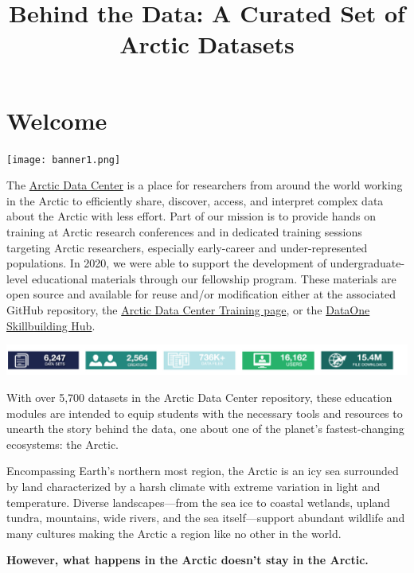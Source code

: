 \documentclass[]{book}
\title{Behind the Data: A Curated Set of Arctic Datasets}
\author{}
\date{\vspace{-2.5em}}
\begin{document}
\maketitle

{
\setcounter{tocdepth}{1}
\tableofcontents
}
\hypertarget{index}{%
\chapter*{\texorpdfstring{\textbf{Welcome}}{Welcome}}\label{index}}

\texttt{[image: banner1.png]}

The \href{https://arcticdata.io/}{Arctic Data Center} is a place for researchers from around the world working in the Arctic to efficiently share, discover, access, and interpret complex data about the Arctic with less effort. Part of our mission is to provide hands on training at Arctic research conferences and in dedicated training sessions targeting Arctic researchers, especially early-career and under-represented populations. In 2020, we were able to support the development of undergraduate-level educational materials through our fellowship program. These materials are open source and available for reuse and/or modification either at the associated GitHub repository, the \href{http://training.arcticdata.io/}{Arctic Data Center Training page}, or the \href{https://dataoneorg.github.io/Education/}{DataOne Skillbuilding Hub}.

\includegraphics{adcfacts.png}

With over 5,700 datasets in the Arctic Data Center repository, these education modules are intended to equip students with the necessary tools and resources to unearth the story behind the data, one about one of the planet's fastest-changing ecosystems: the Arctic.

Encompassing Earth's northern most region, the Arctic is an icy sea surrounded by land characterized by a harsh climate with extreme variation in light and temperature. Diverse landscapes---from the sea ice to coastal wetlands, upland tundra, mountains, wide rivers, and the sea itself---support abundant wildlife and many cultures making the Arctic a region like no other in the world.

\textbf{However, what happens in the Arctic doesn't stay in the Arctic.}
\end{document}
